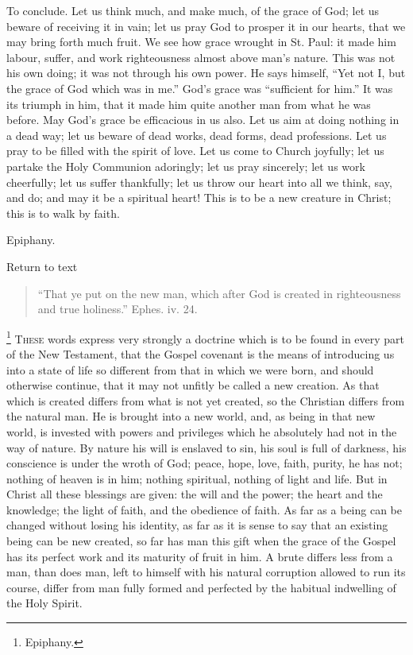 To conclude. Let us think much, and make much, of the grace of God;
let us beware of receiving it in vain; let us pray God to prosper it
in our hearts, that we may bring forth much fruit. We see how grace
wrought in St. Paul: it made him labour, suffer, and work
righteousness almost above man's nature. This was not his own doing;
it was not through his own power. He says himself, ``Yet not I,
but the grace of God which was in me.'' God's grace was
``sufficient for him.'' It was its triumph in him, that it
made him quite another man from what he was before. May God's grace be
efficacious in us also. Let us aim at doing nothing in a dead way; let
us beware of dead works, dead forms, dead professions. Let us pray to
be filled with the spirit of love. Let us come to Church joyfully; let
us partake the Holy Communion adoringly; let us pray sincerely; let us
work cheerfully; let us suffer thankfully; let us throw our heart into
all we think, say, and do; and may it be a spiritual heart! This is to
be a new creature in Christ; this is to walk by faith.


Epiphany.

Return to text


\begin{quote}

``That ye put on the new man, which after God is created in
righteousness and true holiness.'' Ephes. iv. 24.

\end{quote}

\footnote{Epiphany.} T\textsc{hese} words express
very strongly a doctrine which is to be found in every part of the New
Testament, that the Gospel covenant is the means of introducing us
into a state of life so different from that in which we were born, and
should otherwise continue, that it may not unfitly be called a new
creation. As that which is created differs from what is not yet
created, so the Christian differs from the natural man. He is brought
into a new world, and, as being in that new world, is invested with
powers and privileges which he absolutely had not in the way of
nature. By nature his will is enslaved to sin, his soul is full of
darkness, his conscience is under the wroth of God; peace, hope, love,
faith, purity, he has not; nothing of heaven is in him; nothing
spiritual, nothing of light and life. But in Christ all these
blessings are given: the will and the power; the heart and the
knowledge; the light of faith, and the obedience of faith. As far as a
being can be changed without losing his identity, as far as it is
sense to say that an existing being can be new created, so far has man
this gift when the grace of the Gospel has its perfect work and its
maturity of fruit in him. A brute differs less from a man, than does
man, left to himself with his natural corruption allowed to run its
course, differ from man fully formed and perfected by the habitual
indwelling of the Holy Spirit.

